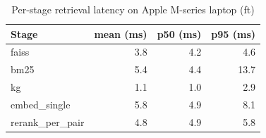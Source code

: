 \begin{table}
\caption{Per-stage retrieval latency on Apple M-series laptop (ft)}
\label{tab:latency_ft}
\begin{tabular}{lrrr}
\toprule
Stage & mean (ms) & p50 (ms) & p95 (ms) \\
\midrule
faiss & 3.8 & 4.2 & 4.6 \\
bm25 & 5.4 & 4.4 & 13.7 \\
kg & 1.1 & 1.0 & 2.9 \\
embed\_single & 5.8 & 4.9 & 8.1 \\
rerank\_per\_pair & 4.8 & 4.9 & 5.8 \\
\bottomrule
\end{tabular}
\end{table}
